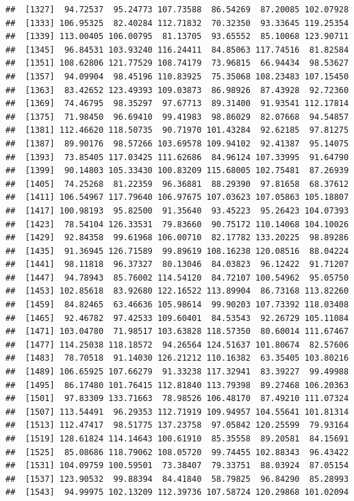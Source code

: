 \documentclass[
]{article}
\begin{document}
\begin{verbatim}
##  [1327]  94.72537  95.24773 107.73588  86.54269  87.20085 102.07928
##  [1333] 106.95325  82.40284 112.71832  70.32350  93.33645 119.25354
##  [1339] 113.00405 106.00795  81.13705  93.65552  85.10068 123.90711
##  [1345]  96.84531 103.93240 116.24411  84.85063 117.74516  81.82584
##  [1351] 108.62806 121.77529 108.74179  73.96815  66.94434  98.53627
##  [1357]  94.09904  98.45196 110.83925  75.35068 108.23483 107.15450
##  [1363]  83.42652 123.49393 109.03873  86.98926  87.43928  92.72360
##  [1369]  74.46795  98.35297  97.67713  89.31400  91.93541 112.17814
##  [1375]  71.98450  96.69410  99.41983  98.86029  82.07668  94.54857
##  [1381] 112.46620 118.50735  90.71970 101.43284  92.62185  97.81275
##  [1387]  89.90176  98.57266 103.69578 109.94102  92.41387  95.14075
##  [1393]  73.85405 117.03425 111.62686  84.96124 107.33995  91.64790
##  [1399]  90.14803 105.33430 100.83209 115.68005 102.75481  87.26939
##  [1405]  74.25268  81.22359  96.36881  88.29390  97.81658  68.37612
##  [1411] 106.54967 117.79640 106.97675 107.03623 107.05863 105.18807
##  [1417] 100.98193  95.82500  91.35640  93.45223  95.26423 104.07393
##  [1423]  78.54104 126.33531  79.83660  90.75172 110.14068 104.10026
##  [1429]  92.84358  99.61968 106.00710  82.17782 133.20225  98.89286
##  [1435]  91.36945 126.71589  99.89619 108.16238 120.08516  88.04224
##  [1441]  98.11818  96.37327  80.13046  84.03823  96.12422  91.71207
##  [1447]  94.78943  85.76002 114.54120  84.72107 100.54962  95.05750
##  [1453] 102.85618  83.92680 122.16522 113.89904  86.73168 113.82260
##  [1459]  84.82465  63.46636 105.98614  99.90203 107.73392 118.03408
##  [1465]  92.46782  97.42533 109.60401  84.53543  92.26729 105.11084
##  [1471] 103.04780  71.98517 103.63828 118.57350  80.60014 111.67467
##  [1477] 114.25038 118.18572  94.26564 124.51637 101.80674  82.57606
##  [1483]  78.70518  91.14030 126.21212 110.16382  63.35405 103.80216
##  [1489] 106.65925 107.66279  91.33238 117.32941  83.39227  99.49988
##  [1495]  86.17480 101.76415 112.81840 113.79398  89.27468 106.20363
##  [1501]  97.83309 133.71663  78.98526 106.48170  87.49210 111.07324
##  [1507] 113.54491  96.29353 112.71919 109.94957 104.55641 101.81314
##  [1513] 112.47417  98.51775 137.23758  97.05842 120.25599  79.93164
##  [1519] 128.61824 114.14643 100.61910  85.35558  89.20581  84.15691
##  [1525]  85.08686 118.79062 108.05720  99.74455 102.88343  96.43422
##  [1531] 104.09759 100.59501  73.38407  79.33751  88.03924  87.05154
##  [1537] 123.90532  99.88394  84.41840  58.79825  96.84290  85.28993
##  [1543]  94.99975 102.13209 112.39736 107.58724 120.29868 101.02094

\end{verbatim}
\end{document}
